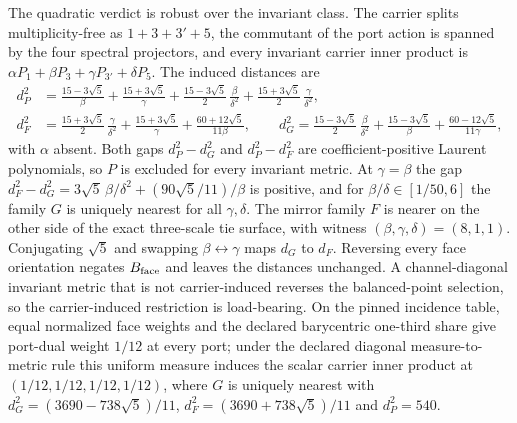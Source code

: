 \documentclass[11pt]{article}
\begin{document}
The quadratic verdict is robust over the invariant class. The carrier splits
multiplicity-free as \(1+3+3'+5\), the commutant of the port action is spanned
by the four spectral projectors, and every invariant carrier inner product is
\(\alpha P_1+\beta P_3+\gamma P_{3'}+\delta P_5\). The induced distances are
\[
\begin{aligned}
 d_P^2&=\frac{15-3\sqrt5}{\beta}+\frac{15+3\sqrt5}{\gamma}
   +\frac{15-3\sqrt5}{2}\,\frac{\beta}{\delta^2}
   +\frac{15+3\sqrt5}{2}\,\frac{\gamma}{\delta^2},\\
 d_F^2&=\frac{15+3\sqrt5}{2}\,\frac{\gamma}{\delta^2}
   +\frac{15+3\sqrt5}{\gamma}+\frac{60+12\sqrt5}{11\beta},\qquad
 d_G^2=\frac{15-3\sqrt5}{2}\,\frac{\beta}{\delta^2}
   +\frac{15-3\sqrt5}{\beta}+\frac{60-12\sqrt5}{11\gamma},
\end{aligned}
\]
with \(\alpha\) absent. Both gaps \(d_P^2-d_G^2\) and \(d_P^2-d_F^2\) are
coefficient-positive Laurent polynomials, so \(P\) is excluded for every
invariant metric. At \(\gamma=\beta\) the gap
\(d_F^2-d_G^2=3\sqrt5\,\beta/\delta^2+(90\sqrt5/11)/\beta\) is positive, and
for \(\beta/\delta\in[1/50,6]\) the family \(G\) is uniquely nearest for all
\(\gamma,\delta\). The mirror family \(F\) is nearer on the other side of the
exact three-scale tie surface, with witness \((\beta,\gamma,\delta)=(8,1,1)\).
Conjugating \(\sqrt5\) and swapping \(\beta\leftrightarrow\gamma\) maps \(d_G\)
to \(d_F\). Reversing every face orientation negates \(B_{\rm face}\) and leaves
the distances unchanged. A channel-diagonal invariant metric that is not
carrier-induced reverses the balanced-point selection, so the carrier-induced
restriction is load-bearing. On the pinned incidence table, equal normalized
face weights and the declared barycentric one-third share give port-dual
weight \(1/12\) at every port; under the declared diagonal measure-to-metric
rule this uniform measure induces the scalar carrier inner product at
\((1/12,1/12,1/12,1/12)\), where \(G\) is uniquely nearest with
\(d_G^2=(3690-738\sqrt5)/11\), \(d_F^2=(3690+738\sqrt5)/11\) and \(d_P^2=540\).
\end{document}
